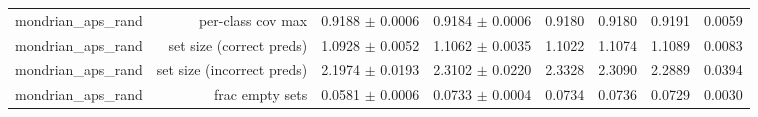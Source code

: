 \begin{table}
\begin{tabular}{lrrrrrrr}
mondrian\_aps\_rand &          per-class cov max &                         0.9188 $\pm$ 0.0006 &                           0.9184 $\pm$ 0.0006 &     0.9180 &     0.9180 &     0.9191 &                                    0.0059 \\
mondrian\_aps\_rand &   set size (correct preds) &                         1.0928 $\pm$ 0.0052 &                           1.1062 $\pm$ 0.0035 &     1.1022 &     1.1074 &     1.1089 &                                    0.0083 \\
mondrian\_aps\_rand & set size (incorrect preds) &                         2.1974 $\pm$ 0.0193 &                           2.3102 $\pm$ 0.0220 &     2.3328 &     2.3090 &     2.2889 &                                    0.0394 \\
mondrian\_aps\_rand &            frac empty sets &                         0.0581 $\pm$ 0.0006 &                           0.0733 $\pm$ 0.0004 &     0.0734 &     0.0736 &     0.0729 &                                    0.0030 \\
\bottomrule
\end{tabular}
\end{table}
